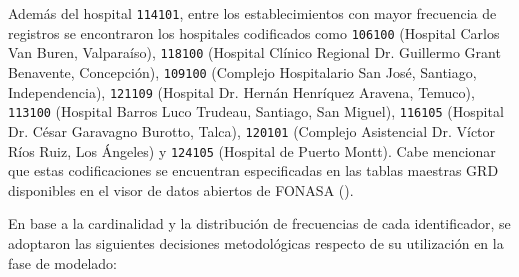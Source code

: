 Además del hospital \texttt{114101}, entre los establecimientos con mayor frecuencia de registros se encontraron los hospitales codificados como \texttt{106100} (Hospital Carlos Van Buren, Valparaíso), \texttt{118100} (Hospital Clínico Regional Dr. Guillermo Grant Benavente, Concepción), \texttt{109100} (Complejo Hospitalario San José, Santiago, Independencia), \texttt{121109} (Hospital Dr. Hernán Henríquez Aravena, Temuco), \texttt{113100} (Hospital Barros Luco Trudeau, Santiago, San Miguel), \texttt{116105} (Hospital Dr. César Garavagno Burotto, Talca), \texttt{120101} (Complejo Asistencial Dr. Víctor Ríos Ruiz, Los Ángeles) y \texttt{124105} (Hospital de Puerto Montt). Cabe mencionar que estas codificaciones se encuentran especificadas en las tablas maestras GRD disponibles en el visor de datos abiertos de FONASA (\cite{fonasa_visor_grd}).

En base a la cardinalidad y la distribución de frecuencias de cada identificador, se adoptaron las siguientes decisiones metodológicas respecto de su utilización en la fase de modelado:

